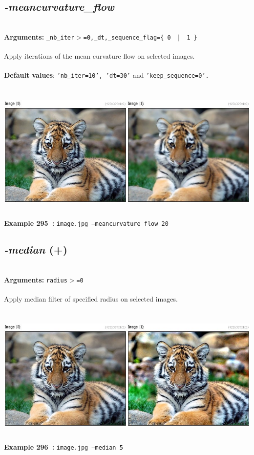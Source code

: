 \documentclass[a4paper,11pt,twoside]{book}
\begin{document}
\subsection{\emph{-meancurvature\_flow} }\vspace*{-0.5em}
~\\\textbf{Arguments: } 
{\small \texttt{\_nb\_iter$>$=0,\_dt,\_sequence\_flag=\{ 0 ~$|$~ 1 \}}}\\~\\
Apply iterations of the mean curvature flow on selected images.
~\\~\\\textbf{Default values}: {\small \texttt{'nb\_iter=10', 'dt=30'} and \texttt{'keep\_sequence=0'.}}
\begin{center}\includegraphics[keepaspectratio=true,height=7cm,width=\textwidth]{img/gmic_def295.jpg}\\
{\footnotesize \textbf{Example 295~:} \texttt{image.jpg --meancurvature\_flow 20}}
\end{center}

\subsection{\emph{-median} (+)}\vspace*{-0.5em}
~\\\textbf{Arguments: } 
{\small \texttt{radius$>$=0}}\\~\\
Apply median filter of specified radius on selected images.
\begin{center}\includegraphics[keepaspectratio=true,height=7cm,width=\textwidth]{img/gmic_def296.jpg}\\
{\footnotesize \textbf{Example 296~:} \texttt{image.jpg --median 5}}
\end{center}
\end{document}
